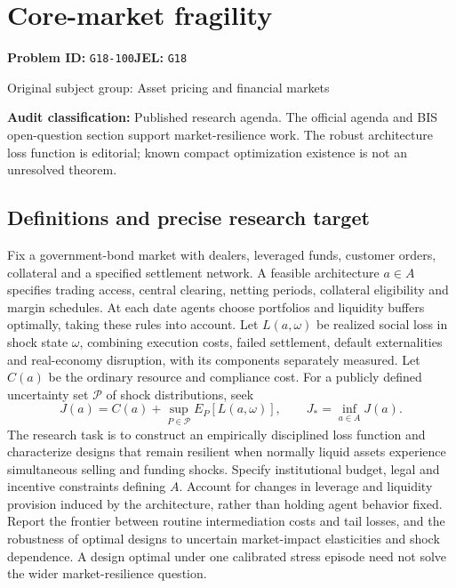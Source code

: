 \documentclass[11pt,a4paper]{article}
\begin{document}
\section*{Core-market fragility}
\textbf{Problem ID:} \texttt{G18-100}\quad \textbf{JEL:} \texttt{G18}\par
\label{problem:OP-0317}
{\sffamily\small\color{muted}Original subject group: Asset pricing and financial markets\par}
\label{definitions:problem:30007599}
\textbf{Audit classification:} Published research agenda. The official agenda and BIS open-question section support market-resilience work. The robust architecture loss function is editorial; known compact optimization existence is not an unresolved theorem.
\subsection*{Definitions and precise research target}
Fix a government-bond market with dealers, leveraged funds, customer orders, collateral and a specified settlement network. A feasible architecture \(a\in A\) specifies trading access, central clearing, netting periods, collateral eligibility and margin schedules. At each date agents choose portfolios and liquidity buffers optimally, taking these rules into account. Let \(L(a,\omega)\) be realized social loss in shock state \(\omega\), combining execution costs, failed settlement, default externalities and real-economy disruption, with its components separately measured. Let \(C(a)\) be the ordinary resource and compliance cost. For a publicly defined uncertainty set \(\mathcal P\) of shock distributions, seek
\[J(a)=C(a)+\sup_{P\in\mathcal P}E_P[L(a,\omega)],\qquad J_*=\inf_{a\in A}J(a).\]
The research task is to construct an empirically disciplined loss function and characterize designs that remain resilient when normally liquid assets experience simultaneous selling and funding shocks. Specify institutional budget, legal and incentive constraints defining \(A\). Account for changes in leverage and liquidity provision induced by the architecture, rather than holding agent behavior fixed. Report the frontier between routine intermediation costs and tail losses, and the robustness of optimal designs to uncertain market-impact elasticities and shock dependence. A design optimal under one calibrated stress episode need not solve the wider market-resilience question.
\end{document}

